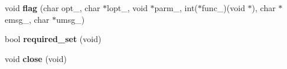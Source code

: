 \begin{DoxyCompactItemize}
\item 
\hypertarget{classenv__t_a32619a9a5d586b4ec83546e7b08ca7ad}{void {\bfseries flag} (char opt\-\_\-, char $\ast$lopt\-\_\-, void $\ast$parm\-\_\-, int($\ast$func\-\_\-)(void $\ast$), char $\ast$emsg\-\_\-, char $\ast$umsg\-\_\-)}\label{classenv__t_a32619a9a5d586b4ec83546e7b08ca7ad}

\item 
\hypertarget{classenv__t_a3ffef5fa59368ad8d501ccd6ea5073f8}{bool {\bfseries required\-\_\-set} (void)}\label{classenv__t_a3ffef5fa59368ad8d501ccd6ea5073f8}

\item 
\hypertarget{classenv__t_a44de80882f3d78e5848e9f59290de2a9}{void {\bfseries close} (void)}\label{classenv__t_a44de80882f3d78e5848e9f59290de2a9}

\end{DoxyCompactItemize}
